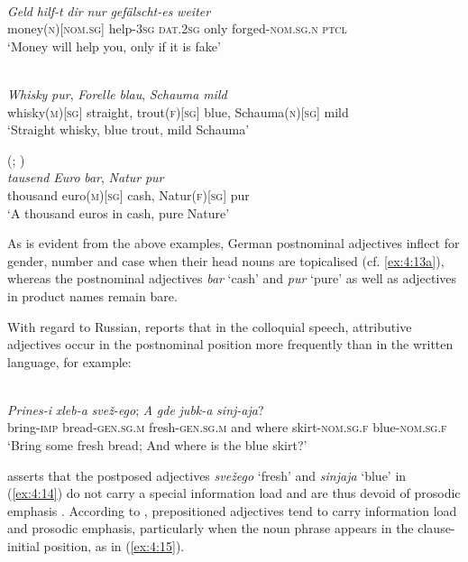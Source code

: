 \ea

\ea{\label{ex:4:13a}}
\citep[234]{eisenberg-satz-1999}\\
\gll \textit{Geld} \textit{hilf-t} \textit{dir} \textit{nur} \textit{gefälscht-es} \textit{weiter}\\
	money(\textsc{n})[\textsc{nom.sg}] help-\textsc{3sg} \textsc{dat.2sg} only forged-\textsc{nom.sg.n} \textsc{ptcl}\\
\glt `Money will help you, only if it is fake'

\ex{\label{ex:4:13b}}
\citep[64, 78]{duerscheid-2002}\\
\gll \textit{Whisky} \textit{pur}, \textit{Forelle} \textit{blau}, \textit{Schauma} \textit{mild}\\
	whisky(\textsc{m})[\textsc{sg}] straight, trout(\textsc{f})[\textsc{sg}] blue, Schauma(\textsc{n})[\textsc{sg}] mild\\
\glt `Straight whisky, blue trout, mild Schauma'

\ex{\label{ex:4:13c}}
(\citealt[350]{duden-2009}; \citealt[67]{duerscheid-2002})\\
\gll \textit{tausend} \textit{Euro} \textit{bar}, \textit{Natur} \textit{pur}\\
	thousand euro(\textsc{m})[\textsc{sg}] cash, Natur(\textsc{f})[\textsc{sg}] pur\\
\glt `A thousand euros in cash, pure Nature'
\z
\z

\noindent As is evident from the above examples, German postnominal adjectives inflect for gender, number and case when their head nouns are topicalised (cf. \ref{ex:4:13a}), whereas the postnominal adjectives \textit{bar} `cash' and \textit{pur} `pure' as well as adjectives in product names remain bare.

With regard to Russian, \citet[149]{zemskaja} reports that in the colloquial speech, attributive adjectives occur in the postnominal position more frequently than in the written language, for example: 

\ea
\label{ex:4:14}
\citep[152]{zemskaja}\\
\gll \textit{Prines-i} \textit{xleb-a} \textit{svež-ego}; \textit{A} \textit{gde} \textit{jubk-a} \textit{sinj-aja}?\\
	bring-\textsc{imp} bread-\textsc{gen.sg.m} fresh-\textsc{gen.sg.m} and where skirt-\textsc{nom.sg.f} blue-\textsc{nom.sg.f}\\
\glt `Bring some fresh bread; And where is the blue skirt?'
\z

\noindent \citet{zemskaja} asserts that the postposed adjectives \textit{svežego} `fresh' and \textit{sinjaja} `blue' in (\ref{ex:4:14}) do not carry a special information load and are thus devoid of prosodic emphasis \citep[cf.][208-212]{lapteva}. According to \citet{zemskaja}, prepositioned adjectives tend to carry information load and prosodic emphasis, particularly when the noun phrase appears in the clause-initial position, as in (\ref{ex:4:15}).

